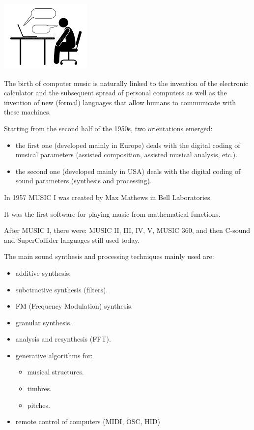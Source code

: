\begin{center}
\includegraphics[scale=0.5]{../img/comp.png}
\end{center}

The birth of computer music is naturally linked to the invention of the electronic calculator and the subsequent spread of personal computers as well as the invention of new (formal) languages that allow humans to communicate with these machines.

Starting from the second half of the 1950s, two orientations emerged:

\begin{itemize}
\tightlist
\item the first one (developed mainly in Europe) deals with the digital coding of musical parameters (assisted composition, assisted musical analysis, etc.).
\item the second one (developed mainly in USA) deals with the digital coding of sound parameters (synthesis and processing).
\end{itemize}

In 1957 MUSIC I was created by Max Mathews in Bell Laboratories.

It was the first software for playing music from mathematical functions.

After MUSIC I, there were: MUSIC II, III, IV, V, MUSIC 360, and then C-sound and SuperCollider languages still used today.

The main sound synthesis and processing techniques mainly used are:

\begin{itemize}
\tightlist
\item additive synthesis.
\item subctractive synthesis (filters).
\item FM (Frequency Modulation) synthesis.
\item granular synthesis.
\item analysis and resynthesis (FFT).
\item generative algorithms for:

  \begin{itemize} 
  \tightlist
  \item musical structures.
  \item timbres.
  \item pitches.
  \end{itemize}
\item remote control of computers (MIDI, OSC, HID)
\end{itemize}

